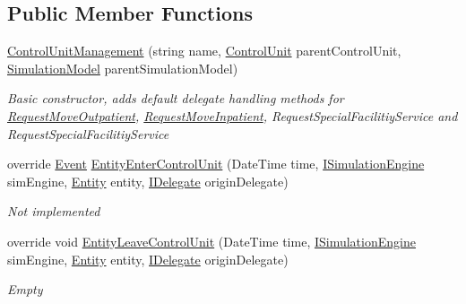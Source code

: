 \subsection*{Public Member Functions}
\begin{DoxyCompactItemize}
\item 
\hyperlink{class_general_health_care_elements_1_1_management_1_1_control_unit_management_ac95ca2cc0f6950fb3183d50b3af02321}{Control\+Unit\+Management} (string name, \hyperlink{class_simulation_core_1_1_h_c_c_m_elements_1_1_control_unit}{Control\+Unit} parent\+Control\+Unit, \hyperlink{class_simulation_core_1_1_simulation_classes_1_1_simulation_model}{Simulation\+Model} parent\+Simulation\+Model)
\begin{DoxyCompactList}\small\item\em Basic constructor, adds default delegate handling methods for \hyperlink{class_general_health_care_elements_1_1_management_1_1_request_move_outpatient}{Request\+Move\+Outpatient}, \hyperlink{class_general_health_care_elements_1_1_management_1_1_request_move_inpatient}{Request\+Move\+Inpatient}, Request\+Special\+Facilitiy\+Service and Request\+Special\+Facilitiy\+Service \end{DoxyCompactList}\item 
override \hyperlink{class_simulation_core_1_1_h_c_c_m_elements_1_1_event}{Event} \hyperlink{class_general_health_care_elements_1_1_management_1_1_control_unit_management_a5a230d59457f53442a11bae5f7c496f8}{Entity\+Enter\+Control\+Unit} (Date\+Time time, \hyperlink{interface_simulation_core_1_1_simulation_classes_1_1_i_simulation_engine}{I\+Simulation\+Engine} sim\+Engine, \hyperlink{class_simulation_core_1_1_h_c_c_m_elements_1_1_entity}{Entity} entity, \hyperlink{interface_simulation_core_1_1_h_c_c_m_elements_1_1_i_delegate}{I\+Delegate} origin\+Delegate)
\begin{DoxyCompactList}\small\item\em Not implemented \end{DoxyCompactList}\item 
override void \hyperlink{class_general_health_care_elements_1_1_management_1_1_control_unit_management_a749db43d75a906dda654df053e6a7e53}{Entity\+Leave\+Control\+Unit} (Date\+Time time, \hyperlink{interface_simulation_core_1_1_simulation_classes_1_1_i_simulation_engine}{I\+Simulation\+Engine} sim\+Engine, \hyperlink{class_simulation_core_1_1_h_c_c_m_elements_1_1_entity}{Entity} entity, \hyperlink{interface_simulation_core_1_1_h_c_c_m_elements_1_1_i_delegate}{I\+Delegate} origin\+Delegate)
\begin{DoxyCompactList}\small\item\em Empty \end{DoxyCompactList}\end{DoxyCompactItemize}
